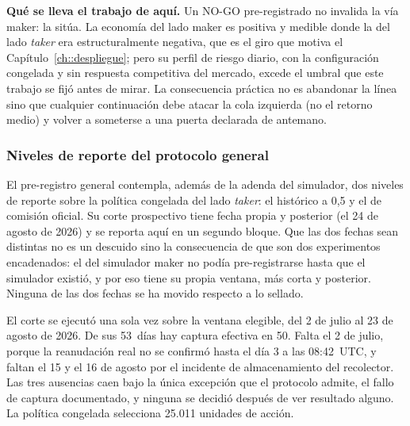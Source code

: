 \textbf{Qué se lleva el trabajo de aquí.} Un NO-GO pre-registrado no invalida la vía
maker: la sitúa. La economía del lado maker es positiva y medible donde la del lado
\emph{taker} era estructuralmente negativa, que es el giro que motiva el
Capítulo~\ref{ch::despliegue}; pero su perfil de riesgo diario, con la configuración
congelada y sin respuesta competitiva del mercado, excede el umbral que este trabajo se
fijó antes de mirar. La consecuencia práctica no es abandonar la línea sino que
cualquier continuación debe atacar la cola izquierda (no el retorno medio) y volver a
someterse a una puerta declarada de antemano.

\subsubsection{Niveles de reporte del protocolo general}

El pre-registro general contempla, además de la adenda del simulador, dos niveles de
reporte sobre la política congelada del lado \emph{taker}: el histórico a 0,5 y el de
comisión oficial. Su corte prospectivo tiene fecha propia y posterior (el 24 de agosto de
2026) y se reporta aquí en un segundo bloque. Que las dos fechas sean distintas no es un
descuido sino la consecuencia de que son dos experimentos encadenados: el del simulador
maker no podía pre-registrarse hasta que el simulador existió, y por eso tiene su propia
ventana, más corta y posterior. Ninguna de las dos fechas se ha movido respecto a lo
sellado.

El corte se ejecutó una sola vez sobre la ventana elegible, del 2 de julio al 23 de agosto
de 2026. De sus 53~días hay captura efectiva en 50. Falta el 2 de julio, porque la
reanudación real no se confirmó hasta el día 3 a las 08:42~UTC, y faltan el 15 y el 16 de
agosto por el incidente de almacenamiento del recolector. Las tres ausencias caen bajo la única excepción que el
protocolo admite, el fallo de captura documentado, y ninguna se decidió después de ver
resultado alguno. La política congelada selecciona 25.011 unidades de acción.

